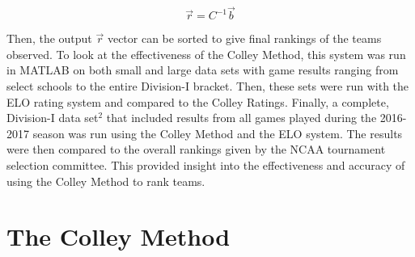 \documentclass[12pt]{article}
\begin{document}
\begin{equation}
\vec{r} = C^{-1} \vec{b}
\label{eq:r}
\end{equation}


Then, the output $\vec{r}$ vector can be sorted to give final rankings of the teams observed. To look at the effectiveness of the Colley Method, this system was run in MATLAB on both small and large data sets with game results ranging from select schools to the entire Division-I bracket. Then, these sets were run with the ELO rating system and compared to the Colley Ratings. Finally, a complete, Division-I data set$^{2}$ that included results from all games played during the 2016-2017 season was run using the Colley Method and the ELO system. The results were then compared to the overall rankings given by the NCAA tournament selection committee. This provided insight into the effectiveness and accuracy of using the Colley Method to rank teams.














\section{The Colley Method}
\label{sec:meth}
\end{document}

